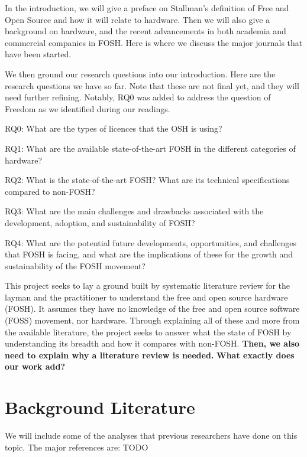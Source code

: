 \documentclass[acmtog]{acmart}
\begin{document}
In the introduction, we will give a preface on Stallman's definition of Free and Open Source and how it will relate to hardware.
Then we will also give a background on hardware, and the recent advancements in both academia and commercial companies in FOSH.
Here is where we discuss the major journals that have been started. 

We then ground our research questions into our introduction.
Here are the research questions we have so far. 
Note that these are not final yet, and they will need further refining.
Notably, RQ0 was added to address the question of Freedom as we identified during our readings. 

RQ0: What are the types of licences that the OSH is using?

RQ1: What are the available state-of-the-art FOSH in the different categories of hardware?

RQ2: What is the state-of-the-art FOSH? What are its technical specifications compared to non-FOSH? 

RQ3: What are the main challenges and drawbacks associated with the development, adoption, and sustainability of FOSH?

RQ4: What are the potential future developments, opportunities, and challenges that FOSH is facing, and what are the implications of these for the growth and sustainability of the FOSH movement?

This project seeks to lay a ground built by systematic literature review for the layman and the practitioner to understand the free and open source hardware (FOSH).
It assumes they have no knowledge of the free and open source software (FOSS) movement, nor hardware.
Through explaining all of these and more from the available literature, the project seeks to answer what the state of FOSH by understanding its breadth and how it compares with non-FOSH.
\textbf{Then, we also need to explain why a literature review is needed.}
\textbf{What exactly does our work add?}

\section{Background Literature}
We will include some of the analyses that previous researchers have done on this topic. The major references are: TODO
\end{document}

